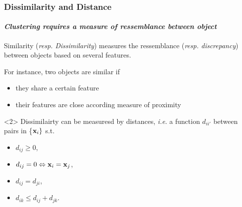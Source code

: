 \documentclass{beamer}\usepackage[]{graphicx}\usepackage[]{color}
\begin{document}
\begin{frame}
  \frametitle{Dissimilarity and Distance}

  \paragraph{\it Clustering requires a measure of ressemblance between object}

  \begin{definition}
    Similarity (\textit{resp. Dissimilarity}) measures the ressemblance (\textit{resp. discrepancy}) between objects based on several features. 
  \end{definition}

  For instance, two objects are similar if 
  \begin{itemize}
    \item they share a certain feature
    \item \alert{their features are close according measure of proximity}
  \end{itemize}
  
  \vfill
  
  \begin{definition}<2>
    Dissimilairty can be measuresd by distances, \textit{i.e.} a function $d_{ii'}$ between pairs in \{$\mathbf{x}_i\}$ s.t.
    \vspace{-.25cm}
    \begin{multicols}{2}
    \begin{itemize}
      \item $d_{ij} \geq 0$,
      \item $d_{ij} = 0 \Leftrightarrow \mathbf{x}_i = \mathbf{x}_{j}$,
      \item $d_{ij} = d_{ji}$,
      \item $d_{ik} \leq d_{ij} + d_{jk}$.
    \end{itemize}
    \end{multicols}
  \end{definition}

\end{frame}
\end{document}
